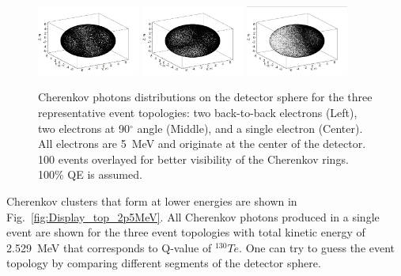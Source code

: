 \documentclass[12pt,twoside,letterpaper]{article}
\newcommand{\Te}{^{130}Te}
\begin{document}
\begin{figure}[htb]
\centering
\includegraphics[angle=0,width=0.3\textwidth]{plots/hDisplay_topology180_5MeV.JPG}
\includegraphics[angle=0,width=0.3\textwidth]{plots/hDisplay_topology90_5MeV.JPG}
\includegraphics[angle=0,width=0.3\textwidth]{plots/hDisplay_1el_5MeV.JPG}
\caption{Cherenkov photons distributions on the detector sphere for the three representative event topologies: two back-to-back electrons (Left), two electrons at 90$^{\circ}$ angle (Middle), and a single electron (Center).  All electrons are 5~MeV and originate at the center of the detector. 100 events overlayed for better visibility of the Cherenkov rings. 100\% QE is assumed.}
\label{fig:Display_top_5MeV}
\end{figure}

Cherenkov clusters that form at lower energies are shown in Fig.~\ref{fig:Display_top_2p5MeV}. All Cherenkov photons produced in a single event are shown for the three event topologies with total kinetic energy of 2.529~MeV that corresponds to Q-value of $\Te$. One can try to guess the event topology by comparing different segments of the detector sphere.
\end{document}
